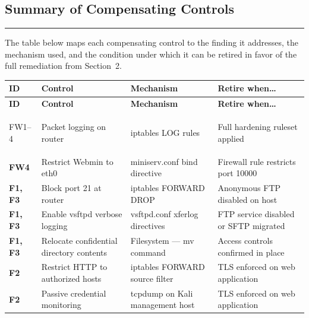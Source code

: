\documentclass[12pt]{article}
\newcommand{\sectionrule}{%
  \vspace{4pt}\noindent\textcolor{headercol}{\rule{\linewidth}{0.8pt}}\vspace{4pt}%
}
\begin{document}
\subsection{Summary of Compensating Controls}
\sectionrule
 
The table below maps each compensating control to the finding it addresses,
the mechanism used, and the condition under which it can be retired in favor
of the full remediation from Section~2.
 
\bigskip
 
\noindent
\begin{longtable}{>{\bfseries}p{1.0cm} p{3.0cm} p{2.8cm} p{3.8cm}}
  \rowcolor{headercol}
  \color{white}\textbf{ID} &
  \color{white}\textbf{Control} &
  \color{white}\textbf{Mechanism} &
  \color{white}\textbf{Retire when\ldots} \\
  \endfirsthead
  \rowcolor{headercol}
  \color{white}\textbf{ID} &
  \color{white}\textbf{Control} &
  \color{white}\textbf{Mechanism} &
  \color{white}\textbf{Retire when\ldots} \\
  \endhead
  \midrule
 
  FW1--4 &
  Packet logging on router &
  iptables LOG rules &
  Full hardening ruleset applied \\[4pt]
 
  FW4 &
  Restrict Webmin to eth0 &
  miniserv.conf bind directive &
  Firewall rule restricts port 10000 \\[4pt]
 
  F1, F3 &
  Block port 21 at router &
  iptables FORWARD DROP &
  Anonymous FTP disabled on host \\[4pt]
 
  F1, F3 &
  Enable vsftpd verbose logging &
  vsftpd.conf xferlog directives &
  FTP service disabled or SFTP migrated \\[4pt]
 
  F1, F3 &
  Relocate confidential directory contents &
  Filesystem --- mv command &
  Access controls confirmed in place \\[4pt]
 
  F2 &
  Restrict HTTP to authorized hosts &
  iptables FORWARD source filter &
  TLS enforced on web application \\[4pt]
 
  F2 &
  Passive credential monitoring &
  tcpdump on Kali management host &
  TLS enforced on web application \\[4pt]
 

\end{longtable}
\end{document}
